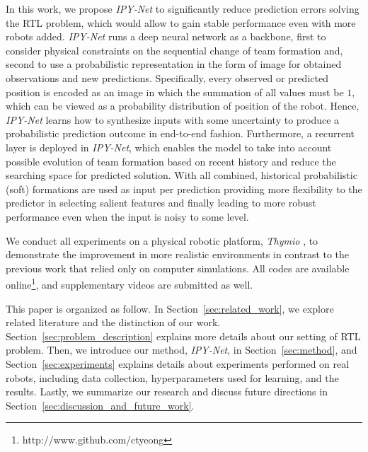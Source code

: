 \documentclass[letterpaper, 10 pt, conference]{ieeeconf}  %
\begin{document}
	In this work, we propose \emph{IPY-Net} to significantly reduce prediction errors solving 
	the RTL problem, which would allow to gain stable performance even with more robots added. 
	\emph{IPY-Net} runs a deep neural network as a backbone, 
	first to consider physical constraints on the sequential change of team formation and, 
	second to use a probabilistic representation in the form of image for obtained observations and 
	new predictions. Specifically, every observed or predicted position is 
	encoded as an image in which the summation of all values must be $1$, which can be
	viewed as a probability distribution of position of the robot. Hence,
	\emph{IPY-Net} learns how to synthesize inputs with some uncertainty to produce a probabilistic 
	prediction outcome in end-to-end fashion. Furthermore, a recurrent layer is deployed in \emph{IPY-Net}, 
	which enables the model to take into account possible evolution of 
	team formation based on recent history and reduce the searching space for predicted solution. 
	With all combined, historical probabilistic (soft) formations are used as input per prediction
	providing more flexibility to the predictor in selecting salient features and finally leading to 
	more robust performance even when the input is noisy to some level.
	
	We conduct all experiments on a physical robotic platform,
	\emph{Thymio} \cite{Shin14}, to demonstrate the improvement in more realistic environments in 
	contrast to the previous work that relied only on computer simulations. 
	All codes are available online\footnote{http://www.github.com/ctyeong}, and supplementary videos 
	are submitted as well. 
		
	This paper is organized as follow. 
	In Section~\ref{sec:related_work}, we explore related literature and the distinction of our work. 
	Section~\ref{sec:problem_description} explains more details about our setting of RTL problem. 
	Then, we introduce our method, \emph{IPY-Net}, in Section~\ref{sec:method}, and 
	Section~\ref{sec:experiments} explains details about experiments performed on real robots, 
	including data collection, hyperparameters used for learning, and the results. 
	Lastly, we summarize our research and discuss future directions 
	in Section~\ref{sec:discussion_and_future_work}.
\end{document}
